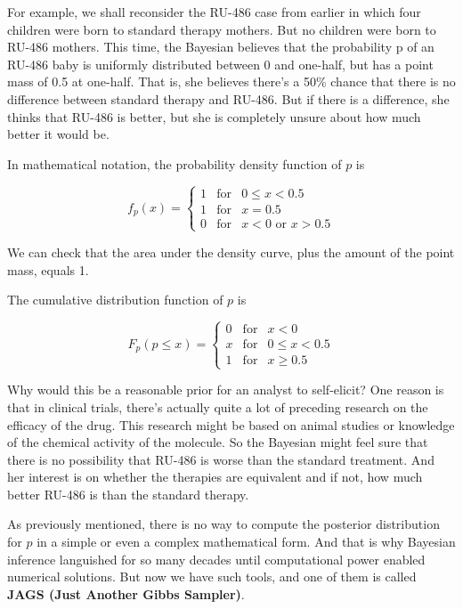 \documentclass[]{book}
\theoremstyle{definition}
\theoremstyle{definition}
\theoremstyle{definition}
\theoremstyle{remark}
\begin{document}
For example, we shall reconsider the RU-486 case from earlier in which
four children were born to standard therapy mothers. But no children
were born to RU-486 mothers. This time, the Bayesian believes that the
probability p of an RU-486 baby is uniformly distributed between 0 and
one-half, but has a point mass of 0.5 at one-half. That is, she believes
there's a 50\% chance that there is no difference between standard
therapy and RU-486. But if there is a difference, she thinks that RU-486
is better, but she is completely unsure about how much better it would
be.

In mathematical notation, the probability density function of \(p\) is

\[f_p(x) = \left\{ \begin{array}{ccc}
1 & \text{for} & 0 \leq x < 0.5 \\
1 & \text{for} & x = 0.5 \\
0 & \text{for} & x < 0 \text{ or } x > 0.5
\end{array}\right.\]

We can check that the area under the density curve, plus the amount of
the point mass, equals 1.

The cumulative distribution function of \(p\) is

\[F_p(p \leq x) = \left\{ \begin{array}{ccc}
0 & \text{for} & x < 0 \\
x & \text{for} & 0 \leq x < 0.5  \\
1 & \text{for} & x \geq 0.5
\end{array}\right.\]

Why would this be a reasonable prior for an analyst to self-elicit? One
reason is that in clinical trials, there's actually quite a lot of
preceding research on the efficacy of the drug. This research might be
based on animal studies or knowledge of the chemical activity of the
molecule. So the Bayesian might feel sure that there is no possibility
that RU-486 is worse than the standard treatment. And her interest is on
whether the therapies are equivalent and if not, how much better RU-486
is than the standard therapy.

As previously mentioned, there is no way to compute the posterior
distribution for \(p\) in a simple or even a complex mathematical form.
And that is why Bayesian inference languished for so many decades until
computational power enabled numerical solutions. But now we have such
tools, and one of them is called \textbf{JAGS (Just Another Gibbs
Sampler)}.
\end{document}
